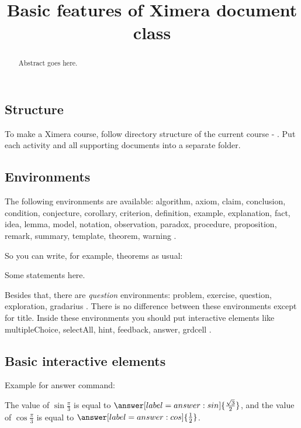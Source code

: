 \documentclass{ximera}
\title{Basic features of Ximera document class}
\begin{document}
\begin{abstract}
Abstract goes here.
\end{abstract}

\maketitle

\subsection*{Structure}

To make a Ximera course, follow directory structure of the current course - .
Put each activity and all supporting documents into a separate folder.

\subsection*{Environments}

The following environments are available:
{\sf
algorithm,
axiom,
claim,
conclusion,
condition,
conjecture,
corollary,
criterion,
definition,
example,
explanation,
fact,
idea,
lemma,
model,
notation,
observation,
paradox,
procedure,
proposition,
remark,
summary,
template,
theorem,
warning
}.

So you can write, for example, theorems as usual:


\begin{theorem}\label{th1}
Some statements here.
\end{theorem}



Besides that, there are {\it question} environments:
{\sf
problem,
exercise,
question,
exploration,
gradarius
}.
There is no difference between these environments except for title.
Inside these environments you should put interactive elements like
{\sf
multipleChoice,
selectAll,
hint,
feedback,
answer,
grdcell
}.

\subsection*{Basic interactive elements}

Example for {\sf answer} command:

\begin{problem}
The value of $\sin \frac{\pi}{3}$ is equal to $\answer[label=answer:sin]{ \frac{\sqrt{3}}{2} }$, and the value of $\cos \frac{\pi}{3}$ is equal to $\answer[label=answer:cos]{\frac{1}{2}}$.
\end{problem}
\end{document}

